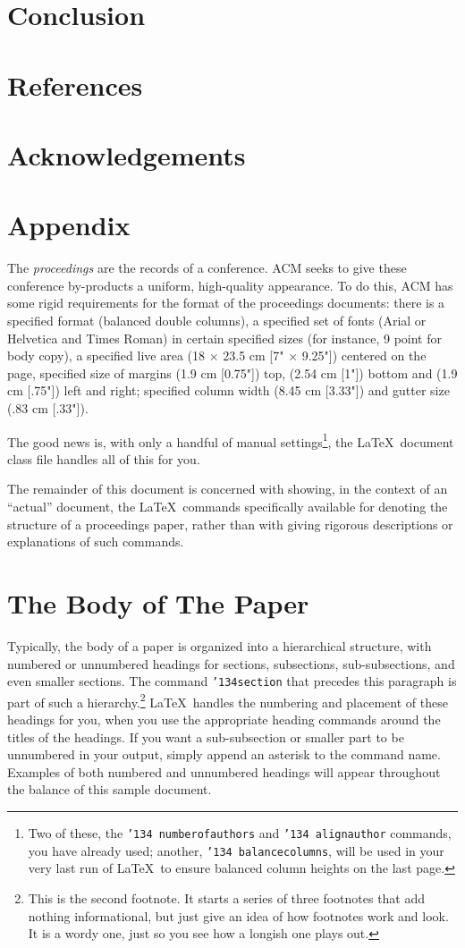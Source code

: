 \documentclass{acm_proc_article-sp}
\begin{document}
\section{Conclusion}
\section{References}
\section{Acknowledgements}
\section{Appendix}


The \textit{proceedings} are the records of a conference.
ACM seeks to give these conference by-products a uniform,
high-quality appearance.  To do this, ACM has some rigid
requirements for the format of the proceedings documents: there
is a specified format (balanced  double columns), a specified
set of fonts (Arial or Helvetica and Times Roman) in
certain specified sizes (for instance, 9 point for body copy),
a specified live area (18 $\times$ 23.5 cm [7" $\times$ 9.25"]) centered on
the page, specified size of margins (1.9 cm [0.75"]) top, (2.54 cm [1"]) bottom
and (1.9 cm [.75"]) left and right; specified column width
(8.45 cm [3.33"]) and gutter size (.83 cm [.33"]).

The good news is, with only a handful of manual
settings\footnote{Two of these, the {\texttt{\char'134 numberofauthors}}
and {\texttt{\char'134 alignauthor}} commands, you have
already used; another, {\texttt{\char'134 balancecolumns}}, will
be used in your very last run of \LaTeX\ to ensure
balanced column heights on the last page.}, the \LaTeX\ document
class file handles all of this for you.

The remainder of this document is concerned with showing, in
the context of an ``actual'' document, the \LaTeX\ commands
specifically available for denoting the structure of a
proceedings paper, rather than with giving rigorous descriptions
or explanations of such commands.

\section{The {\secit Body} of The Paper}
Typically, the body of a paper is organized
into a hierarchical structure, with numbered or unnumbered
headings for sections, subsections, sub-subsections, and even
smaller sections.  The command \texttt{{\char'134}section} that
precedes this paragraph is part of such a
hierarchy.\footnote{This is the second footnote.  It
starts a series of three footnotes that add nothing
informational, but just give an idea of how footnotes work
and look. It is a wordy one, just so you see
how a longish one plays out.} \LaTeX\ handles the numbering
and placement of these headings for you, when you use
the appropriate heading commands around the titles
of the headings.  If you want a sub-subsection or
smaller part to be unnumbered in your output, simply append an
asterisk to the command name.  Examples of both
numbered and unnumbered headings will appear throughout the
balance of this sample document.
\end{document}
